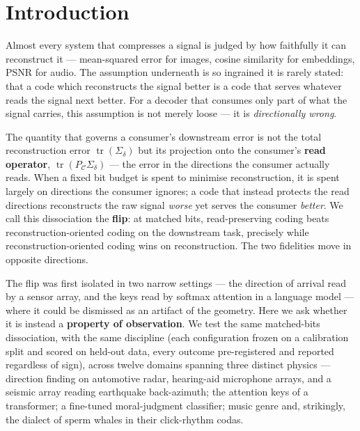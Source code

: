 \documentclass[11pt]{article}
\theoremstyle{remark}
\newcommand{\PC}{P_{\mathcal{C}}}
\newcommand{\Sd}{\Sigma_{\delta}}
\newcommand{\tr}{\operatorname{tr}}
\begin{document}
\section{Introduction}

Almost every system that compresses a signal is judged by how faithfully it can
reconstruct it --- mean-squared error for images, cosine similarity for embeddings, PSNR
for audio. The assumption underneath is so ingrained it is rarely stated: that a code
which reconstructs the signal better is a code that serves whatever reads the signal next
better. For a decoder that consumes only part of what the signal carries, this
assumption is not merely loose --- it is \emph{directionally wrong}.

The quantity that governs a consumer's downstream error is not the total reconstruction
error $\tr(\Sd)$ but its projection onto the consumer's \textbf{read operator},
$\tr(\PC\Sd)$ --- the error in the directions the consumer actually reads. When a fixed
bit budget is spent to minimise reconstruction, it is spent largely on directions the
consumer ignores; a code that instead protects the read directions reconstructs the raw
signal \emph{worse} yet serves the consumer \emph{better}. We call this dissociation the
\textbf{flip}: at matched bits, read-preserving coding beats reconstruction-oriented
coding on the downstream task, precisely while reconstruction-oriented coding wins on
reconstruction. The two fidelities move in opposite directions.

The flip was first isolated in two narrow settings --- the direction of arrival read by a
sensor array, and the keys read by softmax attention in a language model --- where it
could be dismissed as an artifact of the geometry. Here we ask whether it is instead a
\textbf{property of observation}. We test the same matched-bits dissociation, with the
same discipline (each configuration frozen on a calibration split and scored on held-out
data, every outcome pre-registered and reported regardless of sign), across twelve
domains spanning three distinct physics --- direction finding on automotive radar,
hearing-aid microphone arrays, and a seismic array reading earthquake back-azimuth; the
attention keys of a transformer; a fine-tuned moral-judgment classifier; music genre and,
strikingly, the dialect of sperm whales in their click-rhythm codas.
\end{document}
